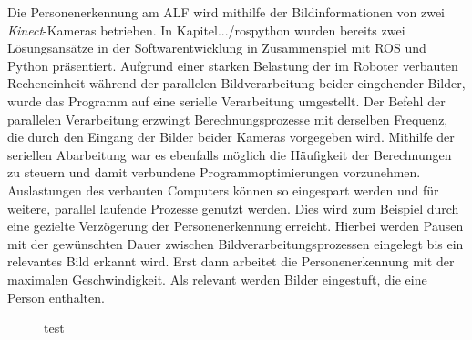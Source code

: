	Die Personenerkennung am ALF wird mithilfe der Bildinformationen von zwei \textit{Kinect}-Kameras betrieben. In Kapitel.../rospython wurden bereits zwei Lösungsansätze in der Softwarentwicklung in Zusammenspiel mit ROS und Python präsentiert. Aufgrund einer starken Belastung der im Roboter verbauten Recheneinheit während der parallelen Bildverarbeitung beider eingehender Bilder, wurde das Programm auf eine serielle Verarbeitung umgestellt. Der Befehl der parallelen Verarbeitung erzwingt Berechnungsprozesse mit derselben Frequenz, die durch den Eingang der Bilder beider Kameras vorgegeben wird. Mithilfe der seriellen Abarbeitung  war es ebenfalls möglich die Häufigkeit der Berechnungen zu steuern und damit verbundene Programmoptimierungen vorzunehmen. Auslastungen des verbauten Computers können so eingespart werden und für weitere, parallel laufende Prozesse genutzt werden. Dies wird zum Beispiel durch eine gezielte Verzögerung der Personenerkennung erreicht. Hierbei werden Pausen mit der gewünschten Dauer zwischen Bildverarbeitungsprozessen eingelegt bis ein relevantes Bild erkannt wird. Erst dann arbeitet die Personenerkennung mit der maximalen Geschwindigkeit. Als relevant werden Bilder eingestuft, die eine Person enthalten.\\
	
	\begin{figure}[H]
		\centering
		\caption{test}
		\label{fig: bbox}
	\end{figure}

